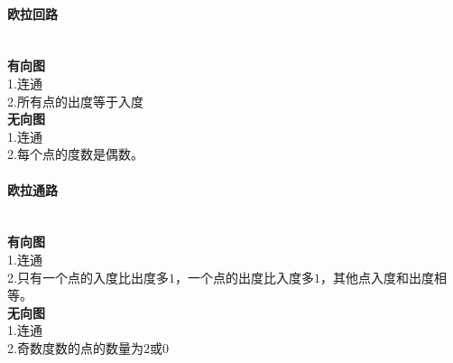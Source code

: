 \paragraph{欧拉回路}~{}
\\
\textbf{有向图}\\
1.连通\\
2.所有点的出度等于入度\\
\textbf{无向图}\\
1.连通\\
2.每个点的度数是偶数。\\

\paragraph{欧拉通路}~{}
\\
\textbf{有向图}\\
1.连通\\
2.只有一个点的入度比出度多$1$，一个点的出度比入度多$1$，其他点入度和出度相等。\\
\textbf{无向图}\\
1.连通\\
2.奇数度数的点的数量为$2$或$0$\\
